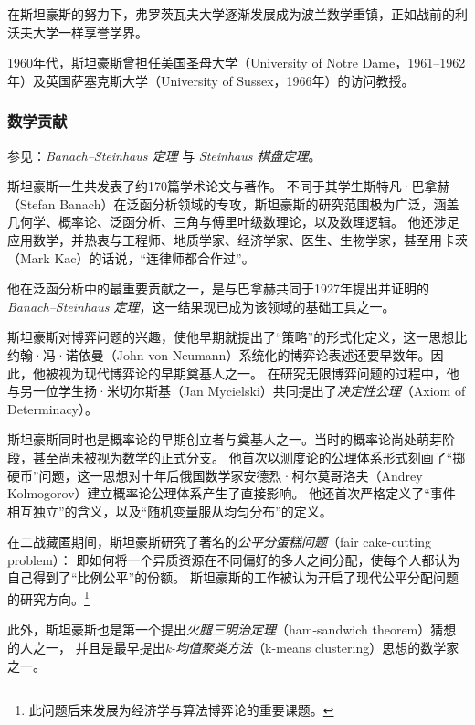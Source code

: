 在斯坦豪斯的努力下，弗罗茨瓦夫大学逐渐发展成为波兰数学重镇，正如战前的利沃夫大学一样享誉学界。\cite{8}

1960年代，斯坦豪斯曾担任美国圣母大学（University of Notre Dame，1961–1962年）及英国萨塞克斯大学（University of Sussex，1966年）的访问教授。\cite{4,9}

\subsubsection{数学贡献}

\noindent 参见：\emph{Banach–Steinhaus 定理} 与 \emph{Steinhaus 棋盘定理}。

斯坦豪斯一生共发表了约170篇学术论文与著作。\cite{4}  
不同于其学生斯特凡·巴拿赫（Stefan Banach）在泛函分析领域的专攻，斯坦豪斯的研究范围极为广泛，涵盖几何学、概率论、泛函分析、三角与傅里叶级数理论，以及数理逻辑。\cite{3,4}  
他还涉足应用数学，并热衷与工程师、地质学家、经济学家、医生、生物学家，甚至用卡茨（Mark Kac）的话说，“连律师都合作过”。\cite{8}

他在泛函分析中的最重要贡献之一，是与巴拿赫共同于1927年提出并证明的\emph{Banach–Steinhaus 定理}，这一结果现已成为该领域的基础工具之一。

斯坦豪斯对博弈问题的兴趣，使他早期就提出了“策略”的形式化定义，这一思想比约翰·冯·诺依曼（John von Neumann）系统化的博弈论表述还要早数年。因此，他被视为现代博弈论的早期奠基人之一。\cite{6}  
在研究无限博弈问题的过程中，他与另一位学生扬·米切尔斯基（Jan Mycielski）共同提出了\emph{决定性公理}（Axiom of Determinacy）。\cite{8}

斯坦豪斯同时也是概率论的早期创立者与奠基人之一。当时的概率论尚处萌芽阶段，甚至尚未被视为数学的正式分支。\cite{8}  
他首次以测度论的公理体系形式刻画了“掷硬币”问题，这一思想对十年后俄国数学家安德烈·柯尔莫哥洛夫（Andrey Kolmogorov）建立概率论公理体系产生了直接影响。\cite{8}  
他还首次严格定义了“事件相互独立”的含义，以及“随机变量服从均匀分布”的定义。\cite{4}

在二战藏匿期间，斯坦豪斯研究了著名的\emph{公平分蛋糕问题}（fair cake-cutting problem）：  
即如何将一个异质资源在不同偏好的多人之间分配，使每个人都认为自己得到了“比例公平”的份额。  
斯坦豪斯的工作被认为开启了现代公平分配问题的研究方向。\footnote{此问题后来发展为经济学与算法博弈论的重要课题。}

此外，斯坦豪斯也是第一个提出\emph{火腿三明治定理}（ham-sandwich theorem）猜想的人之一，\cite{8,10}  
并且是最早提出\emph{k-均值聚类方法}（k-means clustering）思想的数学家之一。\cite{11}
